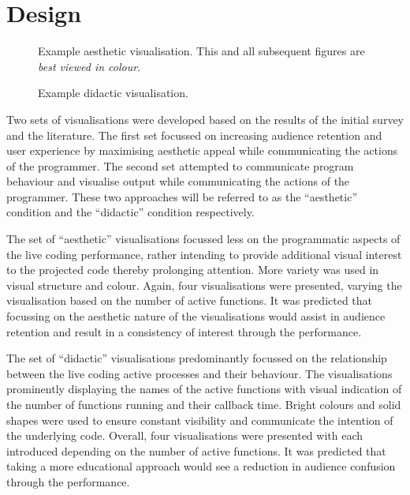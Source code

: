 \documentclass{sig-alternate}
\begin{document}
\section{Design}

\begin{figure}
\centering
{}
\caption{Example aesthetic visualisation. This and all subsequent figures are \textit{best viewed in colour}.}
\label{fig:aesthetic-visualisation}
\end{figure}

\begin{figure}
\centering
{}
\caption{Example didactic visualisation.}
\label{fig:didactic-visualisation}
\end{figure}

Two sets of visualisations were developed based on the results of the initial survey and the literature. The first set focussed on increasing audience retention and user experience by maximising aesthetic appeal \cite{Cawthon2007} while communicating the actions of the programmer. The second set attempted to communicate program behaviour and visualise output while communicating the actions of the programmer. These two approaches will be referred to as the ``aesthetic'' condition and the ``didactic'' condition respectively.

The set of ``aesthetic'' visualisations focussed less on the programmatic aspects of the live coding performance, rather intending to provide additional visual interest to the projected code thereby prolonging attention. More variety was used in visual structure and colour. Again, four visualisations were presented, varying the visualisation based on the number of active functions. It was predicted that focussing on the aesthetic nature of the visualisations would assist in audience retention and result in a consistency of interest through the performance.

The set of ``didactic'' visualisations predominantly focussed on the relationship between the live coding active processes and their behaviour. The visualisations prominently displaying the names of the active functions with visual indication of the number of functions running and their callback time. Bright colours and solid shapes were used to ensure constant visibility and communicate the intention of the underlying code. Overall, four visualisations were presented with each introduced depending on the number of active functions. It was predicted that taking a more educational approach would see a reduction in audience confusion through the performance.
\end{document}
